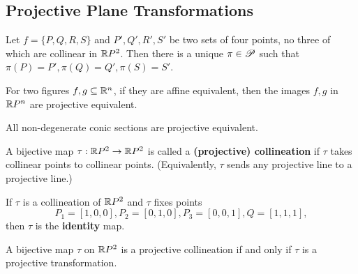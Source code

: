 \subsection{Projective Plane Transformations}

\begin{theorem}
    Let \(f = \{ P,Q,R,S\}\) and \(P', Q', R', S'\) be two sets of four points, no three of which are collinear in \(\mathbb{R} P^2\). Then there is a unique \(\pi \in \mathscr{P}\) such that \(\pi(P) = P', \pi(Q) = Q', \pi(S) = S'\).
\end{theorem}

\begin{proposition}
    For two figures \(f, g \subseteq \mathbb{R}^n\), if they are affine equivalent, then the images \(f, g\) in \(\mathbb{R} P^n\) are projective equivalent.
\end{proposition}

\begin{theorem}
    All non-degenerate conic sections are projective equivalent.
\end{theorem}

\begin{definition}
    A bijective map \(\tau: \mathbb{R} P^2 \to \mathbb{R} P^2\) is called a \textbf{(projective) collineation} if \(\tau\) takes collinear points to collinear points. (Equivalently, \(\tau\) sends any projective line to a projective line.)
\end{definition}

\begin{lemma}
    If \(\tau\) is a collineation of \(\mathbb{R} P^2\) and \(\tau\) fixes points
    \[P_1 = [1, 0, 0], P_2 = [0, 1, 0], P_3 = [0, 0, 1], Q = [1,1,1],\]
    then \(\tau\) is the \textbf{identity} map.
\end{lemma}

\begin{theorem}
    A bijective map \(\tau\) on \(\mathbb{R} P^2\) is a projective collineation if and only if \(\tau\) is a projective transformation.
\end{theorem}

\pagebreak